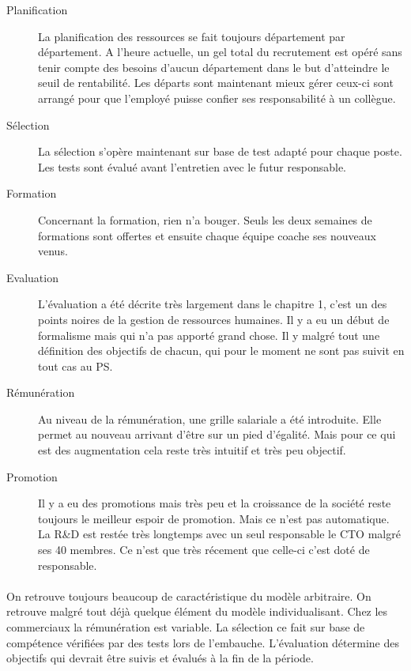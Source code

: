 \begin{description}
  \item[Planification] La planification des ressources se fait toujours département par département. A l'heure actuelle, un gel total du recrutement est opéré sans tenir compte des besoins d'aucun département dans le but d'atteindre le seuil de rentabilité. Les départs sont maintenant mieux gérer ceux-ci sont arrangé pour que l'employé puisse confier ses responsabilité à un collègue.
  \item[Sélection] La sélection s'opère maintenant sur base de test adapté pour chaque poste. Les tests sont évalué avant l'entretien avec le futur responsable. 
  \item[Formation] Concernant la formation, rien n'a bouger. Seuls les deux semaines de formations sont offertes et ensuite chaque équipe coache ses nouveaux venus. 
  \item[Evaluation] L'évaluation a été décrite très largement dans le chapitre 1, c'est un des points noires de la gestion de ressources humaines. Il y a eu un début de formalisme mais qui n'a pas apporté grand chose. Il y malgré tout une définition des objectifs de chacun, qui pour le moment ne sont pas suivit en tout cas au PS. 
  \item[Rémunération] Au niveau de la rémunération, une grille salariale a été introduite. Elle permet au nouveau arrivant d'être sur un pied d'égalité. Mais pour ce qui est des augmentation cela reste très intuitif et très peu objectif.
  \item[Promotion] Il y a eu des promotions mais très peu et la croissance de la société reste toujours le meilleur espoir de promotion. Mais ce n'est pas automatique. La R\&D est restée très longtemps avec un seul responsable le CTO malgré ses 40 membres. Ce n'est que très récement que celle-ci c'est doté de responsable.  
\end{description}

\paragraph{} On retrouve toujours beaucoup de caractéristique du modèle arbitraire. On retrouve malgré tout déjà quelque élément du modèle individualisant. Chez les commerciaux la rémunération est variable. La sélection ce fait sur base de compétence vérifiées par des tests lors de l'embauche. L'évaluation détermine des objectifs qui devrait être suivis et évalués à la fin de la période.


